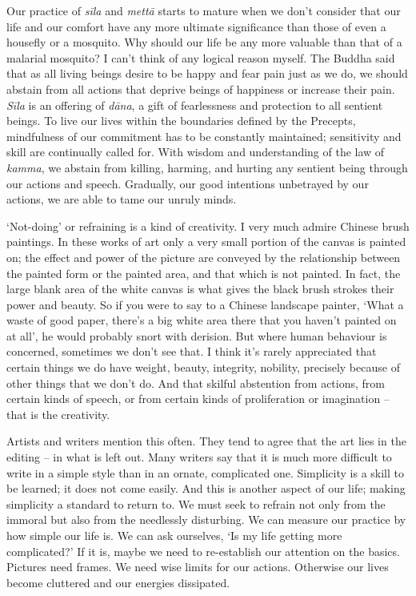 Our practice of \emph{sīla} and \emph{mettā} starts to mature when we
don't consider that our life and our comfort have any more ultimate
significance than those of even a housefly or a mosquito. Why should our
life be any more valuable than that of a malarial mosquito? I can't
think of any logical reason myself. The Buddha said that as all living
beings desire to be happy and fear pain just as we do, we should abstain
from all actions that deprive beings of happiness or increase their
pain. \emph{Sīla} is an offering of \emph{dāna}, a gift of fearlessness
and protection to all sentient beings. To live our lives within the
boundaries defined by the Precepts, mindfulness of our commitment has to
be constantly maintained; sensitivity and skill are continually called
for. With wisdom and understanding of the law of \emph{kamma}, we
abstain from killing, harming, and hurting any sentient being through
our actions and speech. Gradually, our good intentions unbetrayed by our
actions, we are able to tame our unruly minds. 

`Not-doing' or refraining is a kind of creativity. I very much admire
Chinese brush paintings. In these works of art only a very small portion
of the canvas is painted on; the effect and power of the picture are
conveyed by the relationship between the painted form or the painted
area, and that which is not painted. In fact, the large blank area of
the white canvas is what gives the black brush strokes their power and
beauty. So if you were to say to a Chinese landscape painter, `What a
waste of good paper, there's a big white area there that you haven't
painted on at all', he would probably snort with derision. But where
human behaviour is concerned, sometimes we don't see that. I think it's
rarely appreciated that certain things we do have weight, beauty, 
integrity, nobility, precisely because of other things that we don't do. 
And that skilful abstention from actions, from certain kinds of speech, 
or from certain kinds of proliferation or imagination -- that is the
creativity. 

Artists and writers mention this often. They tend to agree that the art
lies in the editing -- in what is left out. Many writers say that it is
much more difficult to write in a simple style than in an ornate, 
complicated one. Simplicity is a skill to be learned; it does not come
easily. And this is another aspect of our life; making simplicity a
standard to return to. We must seek to refrain not only from the immoral
but also from the needlessly disturbing. We can measure our practice by
how simple our life is. We can ask ourselves, `Is my life getting more
complicated?' If it is, maybe we need to re-establish our attention on
the basics. Pictures need frames. We need wise limits for our actions. 
Otherwise our lives become cluttered and our energies dissipated. 

